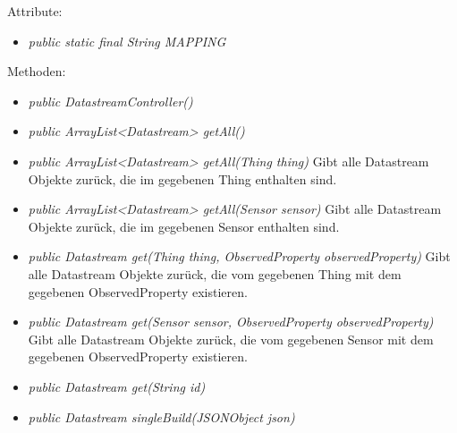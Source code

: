 Attribute:
\begin{itemize}
    \item \emph{public static final String MAPPING} \mappingDescription
\end{itemize}
Methoden:
\begin{itemize}
    \item \emph{public DatastreamController()}
    \item \emph{public ArrayList<Datastream> getAll()}
    \extendsSensorthingController
    \item \emph{public ArrayList<Datastream> getAll(Thing thing)}
    Gibt alle Datastream Objekte zurück, die im gegebenen Thing enthalten sind.
    \item \emph{public ArrayList<Datastream> getAll(Sensor sensor)}
    Gibt alle Datastream Objekte zurück, die im gegebenen Sensor enthalten sind.
    \item \emph{public Datastream get(Thing thing, ObservedProperty observedProperty)}
    Gibt alle Datastream Objekte zurück, die vom gegebenen Thing mit dem gegebenen ObservedProperty existieren.
    \item \emph{public Datastream get(Sensor sensor, ObservedProperty observedProperty)}
    Gibt alle Datastream Objekte zurück, die vom gegebenen Sensor mit dem gegebenen ObservedProperty existieren.
    \item \emph{public Datastream get(String id)}
    \extendsSensorthingController
    \item \emph{public Datastream singleBuild(JSONObject json)}
    \extendsSensorthingController
\end{itemize}

